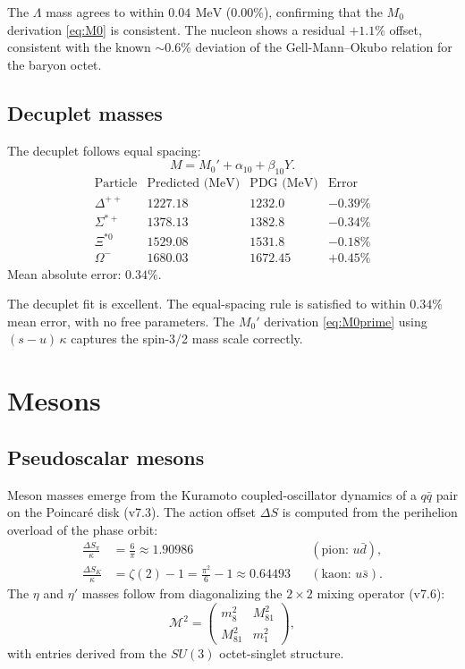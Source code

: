 \documentclass[aps,prd,reprint,twocolumn,showpacs,superscriptaddress]{revtex4-2}
\newcommand{\mev}{\,\text{MeV}}
\begin{document}
The $\Lambda$ mass agrees to within $0.04\ \mev$ ($0.00\%$), confirming
that the $M_0$ derivation \eqref{eq:M0} is consistent.  The nucleon
shows a residual $+1.1\%$ offset, consistent with the known
$\sim\!0.6\%$ deviation of the Gell-Mann--Okubo relation for the baryon
octet.

\subsection{Decuplet masses}

The decuplet follows equal spacing:
\begin{equation}
M = M_0' + \alpha_{10} + \beta_{10} Y.
\label{eq:gmo_decuplet}
\end{equation}
\[
\begin{array}{lcccr}
\text{Particle} & \text{Predicted (MeV)} & \text{PDG (MeV)} & \text{Error} \\
\Delta^{++}     & 1227.18  & 1232.0   & -0.39\% \\
\Sigma^{*+}     & 1378.13  & 1382.8   & -0.34\% \\
\Xi^{*0}        & 1529.08  & 1531.8   & -0.18\% \\
\Omega^-        & 1680.03  & 1672.45  & +0.45\%
\end{array}
\]
Mean absolute error: $0.34\%$.

The decuplet fit is excellent.  The equal-spacing rule is satisfied
to within $0.34\%$ mean error, with no free parameters.  The $M_0'$
derivation \eqref{eq:M0prime} using $(s-u)\,\kappa$ captures the
spin-3/2 mass scale correctly.

\section{Mesons}
\label{sec:mesons}

\subsection{Pseudoscalar mesons}

Meson masses emerge from the Kuramoto coupled-oscillator dynamics of a
$q\bar{q}$ pair on the Poincar\'{e} disk (v7.3).  The action offset
$\Delta S$ is computed from the perihelion overload of the phase orbit:
\begin{align}
\frac{\Delta S_\pi}{\kappa} &= \frac{6}{\pi}
    \approx 1.90986
    &&(\text{pion: } u\bar{d}), \\
\frac{\Delta S_K}{\kappa} &= \zeta(2) - 1
    = \frac{\pi^2}{6} - 1
    \approx 0.64493
    &&(\text{kaon: } u\bar{s}).
\end{align}
The $\eta$ and $\eta'$ masses follow from diagonalizing the
$2 \times 2$ mixing operator (v7.6):
\begin{equation}
\mathcal{M}^2 =
\begin{pmatrix}
m_8^2 & M_{81}^2 \\
M_{81}^2 & m_1^2
\end{pmatrix},
\end{equation}
with entries derived from the $SU(3)$ octet-singlet structure.
\end{document}
